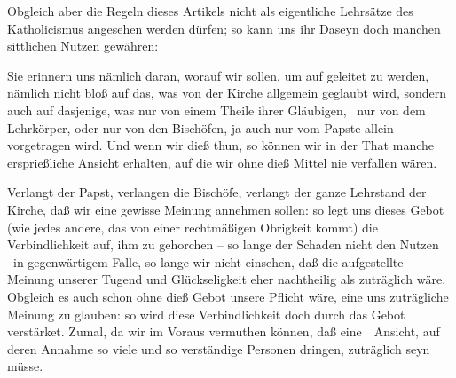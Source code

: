 \begin{aufza}
\item Obgleich aber die Regeln dieses Artikels nicht als eigentliche Lehrsätze des Katholicismus angesehen werden dürfen; so kann uns ihr Daseyn doch manchen sittlichen Nutzen gewähren:
\begin{aufzb}
\item Sie erinnern uns nämlich daran, worauf wir  sollen, um auf  geleitet zu werden, nämlich nicht bloß auf das, was von der Kirche allgemein geglaubt wird, sondern auch auf dasjenige, was nur von einem Theile ihrer Gläubigen, \zB\ nur von dem Lehrkörper, oder nur von den Bischöfen, ja auch nur vom Papste allein vorgetragen wird. Und wenn wir dieß thun, so können wir in der That manche ersprießliche Ansicht erhalten, auf die wir ohne dieß Mittel nie verfallen wären.
\item Verlangt der Papst, verlangen die Bischöfe, verlangt der ganze Lehrstand der Kirche, daß wir eine gewisse Meinung annehmen sollen: so legt uns dieses Gebot (wie jedes andere, das von einer rechtmäßigen Obrigkeit kommt) die Verbindlichkeit auf, ihm zu gehorchen -- so lange der Schaden nicht  den Nutzen  \dh\ in gegenwärtigem Falle, so lange wir nicht  einsehen, daß die aufgestellte Meinung unserer Tugend und Glückseligkeit eher nachtheilig als zuträglich wäre. Obgleich es auch schon ohne dieß Gebot unsere Pflicht wäre, eine uns zuträgliche Meinung zu glauben: so wird diese Verbindlichkeit doch durch das Gebot verstärket.
Zumal, da wir im Voraus vermuthen können, daß eine~\ Ansicht, auf deren Annahme so viele und so verständige Personen dringen, zuträglich seyn müsse.
\end{aufzb}
\end{aufza}

